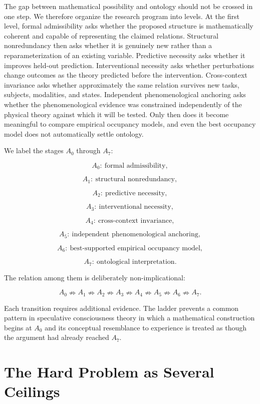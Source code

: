 The gap between mathematical possibility and ontology should not be crossed in one step. We therefore organize the research program into levels. At the first level, formal admissibility asks whether the proposed structure is mathematically coherent and capable of representing the claimed relations. Structural nonredundancy then asks whether it is genuinely new rather than a reparameterization of an existing variable. Predictive necessity asks whether it improves held-out prediction. Interventional necessity asks whether perturbations change outcomes as the theory predicted before the intervention. Cross-context invariance asks whether approximately the same relation survives new tasks, subjects, modalities, and states. Independent phenomenological anchoring asks whether the phenomenological evidence was constrained independently of the physical theory against which it will be tested. Only then does it become meaningful to compare empirical occupancy models, and even the best occupancy model does not automatically settle ontology.

We label the stages $A_0$ through $A_7$:

\[
A_0:\ \text{formal admissibility},
\]

\[
A_1:\ \text{structural nonredundancy},
\]

\[
A_2:\ \text{predictive necessity},
\]

\[
A_3:\ \text{interventional necessity},
\]

\[
A_4:\ \text{cross-context invariance},
\]

\[
A_5:\ \text{independent phenomenological anchoring},
\]

\[
A_6:\ \text{best-supported empirical occupancy model},
\]

\[
A_7:\ \text{ontological interpretation}.
\]

The relation among them is deliberately non-implicational:

\[
A_0\nRightarrow A_1\nRightarrow A_2\nRightarrow A_3\nRightarrow A_4\nRightarrow A_5\nRightarrow A_6\nRightarrow A_7.
\]

Each transition requires additional evidence. The ladder prevents a common pattern in speculative consciousness theory in which a mathematical construction begins at $A_0$ and its conceptual resemblance to experience is treated as though the argument had already reached $A_7$.

\section{The Hard Problem as Several Ceilings}

